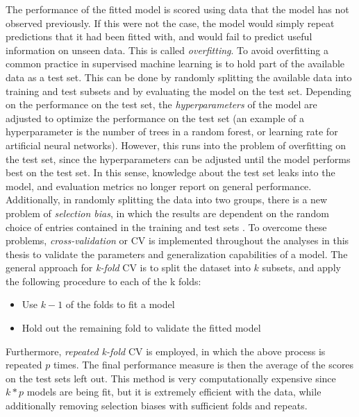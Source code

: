 \documentclass[a4paper, twoside, final, 12pt]{article}
\begin{document}
The performance of the fitted model is scored using data that the model has not observed previously.
If this were not the case, the model would simply repeat predictions that  it had been fitted with, and would fail to predict useful information on  unseen data.
This is called \textit{overfitting}. To avoid overfitting a common practice in supervised machine learning is to hold part of the available data as a test set.
This can be done by randomly splitting the available data into training and test subsets and by evaluating the model on the test set.
Depending on the performance on the test set, the \textit{hyperparameters} of the model are adjusted to optimize the performance on the test set  (an example of a hyperparameter is the number of trees in a random forest, or learning rate for artificial neural networks).
However, this runs into the problem of overfitting on the test set, since the hyperparameters can be adjusted until the model performs best on the test set.
In this sense, knowledge about the test set leaks into the model, and evaluation metrics no longer report on general performance.
Additionally, in randomly splitting the data into two groups, there is a new problem of \textit{selection bias}, in which the results are dependent on the random choice of entries contained in the training and test sets \cite{Selection_Bias}.
To overcome these problems, \textit{cross-validation} or CV is implemented throughout the analyses in this thesis to validate the parameters and generalization capabilities of a model.
The general approach for \textit{k-fold} CV is to split the dataset into $k$ subsets, and apply the following procedure to each of the k folds:
\begin{itemize}
	\item Use $k-1$ of the folds to fit a model 
	\item Hold out the remaining fold to validate the fitted model
\end{itemize}
Furthermore, \textit{repeated k-fold} CV is employed, in which the above process is repeated $p$ times.
The final performance measure is then the average of the scores on the test sets left out.
This method is very computationally expensive since $k*p$ models are being fit, but it is extremely efficient with the data, while additionally removing selection biases with sufficient folds and repeats.
\end{document}
